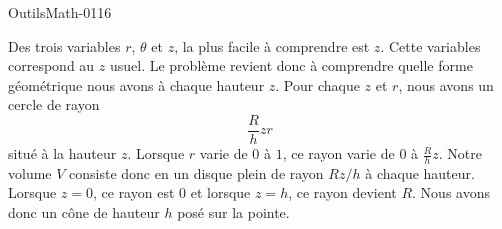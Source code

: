 
\begin{corrige}{OutilsMath-0116}

    Des trois variables $r$, $\theta$ et $z$, la plus facile à comprendre est $z$. Cette variables correspond au $z$ usuel. Le problème revient donc à comprendre quelle forme géométrique nous avons à chaque hauteur $z$. Pour chaque $z$ et $r$, nous avons un cercle de rayon
    \begin{equation}
        \frac{ R }{ h }zr
    \end{equation}
    situé à la hauteur $z$. Lorsque $r$ varie de $0$ à $1$, ce rayon varie de $0$ à $\frac{ R }{ h }z$. Notre volume $V$ consiste donc en un disque plein de rayon $Rz/h$ à chaque hauteur. Lorsque $z=0$, ce rayon est $0$ et lorsque $z=h$, ce rayon devient $R$. Nous avons donc un cône de hauteur $h$ posé sur la pointe.


\end{corrige}
